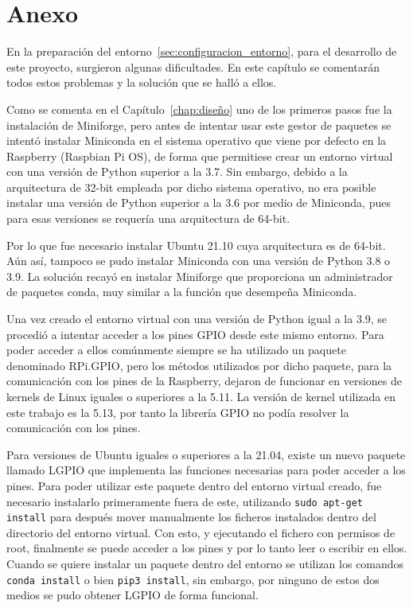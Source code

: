 \documentclass[a4paper, 12pt]{book}
\begin{document}
\chapter{Anexo}
\label{chap:anexo}

En la preparación del entorno~\ref{sec:configuracion_entorno}, para el desarrollo de este proyecto, surgieron algunas dificultades. En este capítulo se comentarán todos estos problemas y la solución que se halló a ellos.

Como se comenta en el Capítulo~\ref{chap:diseño} uno de los primeros pasos fue la instalación de Miniforge, pero antes de intentar usar este gestor de paquetes se intentó instalar Miniconda en el sistema operativo que viene por defecto en la Raspberry (Raspbian Pi OS), de forma que permitiese crear un entorno virtual con una versión de Python superior a la 3.7. Sin embargo, debido a la arquitectura de 32-bit empleada por dicho sistema operativo, no era posible instalar una versión de Python superior a la 3.6 por medio de Miniconda, pues para esas versiones se requería una arquitectura de 64-bit.

Por lo que fue necesario instalar Ubuntu 21.10 cuya arquitectura es de 64-bit. Aún así, tampoco se pudo instalar Miniconda con una versión de Python 3.8 o 3.9. La solución recayó en instalar Miniforge que proporciona un administrador de paquetes conda, muy similar a la función que desempeña Miniconda.

Una vez creado el entorno virtual con una versión de Python igual a la 3.9, se procedió a intentar acceder a los pines GPIO desde este mismo entorno. Para poder acceder a ellos comúnmente siempre se ha utilizado un paquete denominado RPi.GPIO, pero los métodos utilizados por dicho paquete, para la comunicación con los pines de la Raspberry, dejaron de funcionar en versiones de kernels de Linux iguales o superiores a la 5.11. La versión de kernel utilizada en este trabajo es la 5.13, por tanto la librería GPIO no podía resolver la comunicación con los pines.

Para versiones de Ubuntu iguales o superiores a la 21.04, existe un nuevo paquete llamado LGPIO que implementa las funciones necesarias para poder acceder a los pines. Para poder utilizar este paquete dentro del entorno virtual creado, fue necesario instalarlo primeramente fuera de este, utilizando \texttt{sudo apt-get install} para después mover manualmente los ficheros instalados dentro del directorio del entorno virtual. Con esto, y ejecutando el fichero con permisos de root, finalmente se puede acceder a los pines y por lo tanto leer o escribir en ellos.\\
Cuando se quiere instalar un paquete dentro del entorno se utilizan los comandos \texttt{conda install} o bien \texttt{pip3 install}, sin embargo, por ninguno de estos dos medios se pudo obtener LGPIO de forma funcional.
\end{document}
